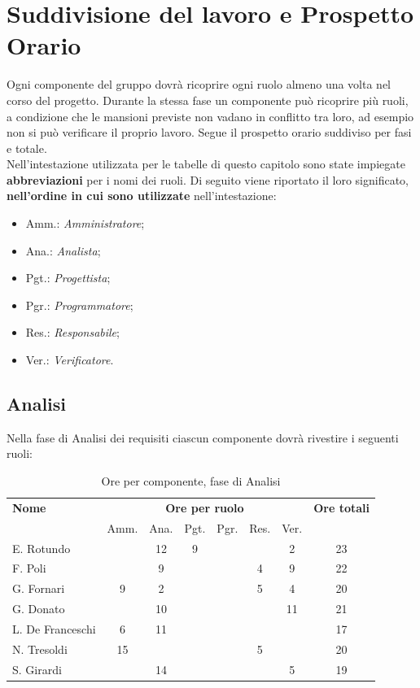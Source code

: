 \section{Suddivisione del lavoro e Prospetto Orario} 


Ogni componente del gruppo dovrà ricoprire ogni ruolo almeno una volta nel corso del progetto.
Durante la stessa fase un componente può ricoprire più ruoli, a condizione che le mansioni previste non vadano in conflitto tra loro, ad esempio non si può verificare il proprio lavoro.
Segue il prospetto orario suddiviso per fasi e totale. \\

Nell'intestazione utilizzata per le tabelle di questo capitolo sono state impiegate \textbf{abbreviazioni} per i nomi dei ruoli.
Di seguito viene riportato il loro significato, \textbf{nell'ordine in cui sono utilizzate} nell'intestazione:
\begin{itemize}
\item Amm.: \textit{Amministratore};
\item Ana.: \textit{Analista};
\item Pgt.: \textit{Progettista};
\item Pgr.: \textit{Programmatore};
\item Res.: \textit{Responsabile};
\item Ver.: \textit{Verificatore}.
\end{itemize}

\pagebreak
\subsection{Analisi}

Nella fase di Analisi dei requisiti ciascun componente dovrà rivestire i seguenti ruoli:
\noindent
\begin{table}[H]
\begin{tabular}{lccccccc}
\toprule
    \textbf{Nome}  & \multicolumn{6}{c}{\textbf{Ore per ruolo}} & \textbf{Ore totali} \\
     & Amm. & Ana. & Pgt. & Pgr. & Res. & Ver. & \\
    \midrule
    
    E. Rotundo 		&   & 12 & 9 &  &  & 2 & 23 \\
    F. Poli 		&   & 9 &  &  & 4 & 9 & 22 \\
    G. Fornari		& 9 & 2 & 	&  & 5 & 4 & 20 \\
    G. Donato 		&   & 10 &  &  &  & 11 & 21 \\
    L. De Franceschi  & 6 & 11 &  &  &  &  & 17 \\
    N. Tresoldi 		& 15&  &  &  & 5 &  & 20 \\
   	S. Girardi 		&   & 14 &  &  &  & 5 & 19 \\
    
    \bottomrule
\end{tabular}
\caption{Ore per componente, fase di Analisi}
\end{table}

